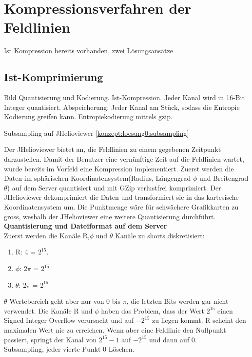 \section{Kompressionsverfahren der Feldlinien} \label{konzept}
Ist Kompression bereits vorhanden, zwei Lösungsansätze

\subsection{Ist-Komprimierung} \label{konzept:ist-komprimierung}
Bild
Quantisierung und Kodierung. 
Ist-Kompression. Jeder Kanal wird in 16-Bit Integer quantisiert.
Abspeicherung: Jeder Kanal am Stück, sodass die Entropie Kodierung greifen kann. Entropiekodierung mittels gzip.

Subsampling auf JHelioviewer \ref{konzept:loesung0:subsampling}

Der JHelioviewer bietet an, die Feldlinien zu einem gegebenen Zeitpunkt darzustellen. Damit der Benutzer eine vernünftige Zeit auf die Feldlinien wartet, wurde bereits im Vorfeld eine Kompression implementiert. Zuerst werden die Daten im sphärischen Koordinatensystem(Radius, Längengrad $\phi$ und Breitengrad $\theta$) auf dem Server quantisiert und mit GZip verlustfrei komprimiert. Der JHelioviewer dekomprimiert die Daten und transformiert sie in das kartesische Koordinatensystem um. Die Punktmenge wäre für schwächere Grafikkarten zu gross, weshalb der JHelioviewer eine weitere Quantisierung durchführt.\\
[\baselineskip]
\textbf{Quantisierung und Dateiformat auf dem Server}\\
Zuerst werden die Kanäle R,$\phi$ und $\theta$ Kanäle zu shorts diskretisiert:
\begin{enumerate}
 \item R: 4 = $2^{15}$. 
 \item $\phi$: $2\pi$ = $2^{15}$
 \item $\theta$: $2\pi$ = $2^{15}$
\end{enumerate}
$\theta$ Wertebereich geht aber nur von 0 bis $\pi$, die letzten Bits werden gar nicht verwendet. Die Kanäle R und $\phi$ haben das Problem, dass der Wert $2^{15}$ einen Signed Integer Overflow verursacht und auf $-2^{15}$ zu liegen kommt. R scheint den maximalen Wert nie zu erreichen. Wenn aber eine Feldlinie den Nullpunkt passiert, springt der Kanal von  $2^{15}-1$ auf $-2^{15}$ und dann auf 0.\\
[\baselineskip]
Subsampling, jeder vierte Punkt 
0 Löschen.

